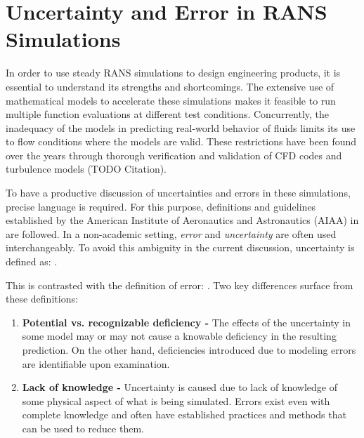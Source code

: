 \section{Uncertainty and Error in RANS Simulations}

In order to use steady RANS simulations to design engineering products, it is essential to understand its strengths and shortcomings. The extensive use of mathematical models to accelerate these simulations makes it feasible to run multiple function evaluations at different test conditions. Concurrently, the inadequacy of the models in predicting real-world behavior of fluids limits its use to flow conditions where the models are valid. These restrictions have been found over the years through thorough verification and validation of CFD codes and turbulence models (TODO Citation). 

To have a productive discussion of uncertainties and errors in these simulations, precise language is required. For this purpose, definitions and guidelines established by the American Institute of Aeronautics and Astronautics (AIAA) in \cite{computational_fluid_dynamics_committee_guide_1998} are followed. In a non-academic setting, \textit{error} and \textit{uncertainty} are often used interchangeably. To avoid this ambiguity in the current discussion, uncertainty is defined as: 
 \cite{computational_fluid_dynamics_committee_guide_1998}. 

This is contrasted with the definition of error: 
 \cite{computational_fluid_dynamics_committee_guide_1998}. Two key differences surface from these definitions: 

\begin{enumerate}
    \item \textbf{Potential vs. recognizable deficiency -} The effects of the uncertainty in some model may or may not cause a knowable deficiency in the resulting prediction. On the other hand, deficiencies introduced due to modeling errors are identifiable upon examination. 
    
    \item \textbf{Lack of knowledge -} Uncertainty is caused due to lack of knowledge of some physical aspect of what is being simulated. Errors exist even with complete knowledge and often have established practices and methods that can be used to reduce them.  
\end{enumerate}

